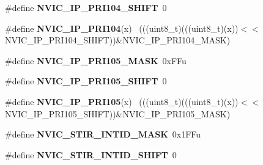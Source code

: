 \begin{DoxyCompactItemize}
\item 
\hypertarget{group___n_v_i_c___register___masks_ga5124fd80e722da1ac6aa1f2109ce0132}{}\#define {\bfseries N\+V\+I\+C\+\_\+\+I\+P\+\_\+\+P\+R\+I104\+\_\+\+S\+H\+I\+F\+T}~0\label{group___n_v_i_c___register___masks_ga5124fd80e722da1ac6aa1f2109ce0132}

\item 
\hypertarget{group___n_v_i_c___register___masks_gaeb4cff0ccb42c6ee2872c860039c05dd}{}\#define {\bfseries N\+V\+I\+C\+\_\+\+I\+P\+\_\+\+P\+R\+I104}(x)                                            ~(((uint8\+\_\+t)(((uint8\+\_\+t)(x))$<$$<$N\+V\+I\+C\+\_\+\+I\+P\+\_\+\+P\+R\+I104\+\_\+\+S\+H\+I\+F\+T))\&N\+V\+I\+C\+\_\+\+I\+P\+\_\+\+P\+R\+I104\+\_\+\+M\+A\+S\+K)\label{group___n_v_i_c___register___masks_gaeb4cff0ccb42c6ee2872c860039c05dd}

\item 
\hypertarget{group___n_v_i_c___register___masks_gae42f2672541d808a9a15fa95a7331aed}{}\#define {\bfseries N\+V\+I\+C\+\_\+\+I\+P\+\_\+\+P\+R\+I105\+\_\+\+M\+A\+S\+K}~0x\+F\+Fu\label{group___n_v_i_c___register___masks_gae42f2672541d808a9a15fa95a7331aed}

\item 
\hypertarget{group___n_v_i_c___register___masks_ga07317c8ff3f511dddf014970a1abb661}{}\#define {\bfseries N\+V\+I\+C\+\_\+\+I\+P\+\_\+\+P\+R\+I105\+\_\+\+S\+H\+I\+F\+T}~0\label{group___n_v_i_c___register___masks_ga07317c8ff3f511dddf014970a1abb661}

\item 
\hypertarget{group___n_v_i_c___register___masks_gae83d8a206aaa8cb026a0945a7008444b}{}\#define {\bfseries N\+V\+I\+C\+\_\+\+I\+P\+\_\+\+P\+R\+I105}(x)                                            ~(((uint8\+\_\+t)(((uint8\+\_\+t)(x))$<$$<$N\+V\+I\+C\+\_\+\+I\+P\+\_\+\+P\+R\+I105\+\_\+\+S\+H\+I\+F\+T))\&N\+V\+I\+C\+\_\+\+I\+P\+\_\+\+P\+R\+I105\+\_\+\+M\+A\+S\+K)\label{group___n_v_i_c___register___masks_gae83d8a206aaa8cb026a0945a7008444b}

\item 
\hypertarget{group___n_v_i_c___register___masks_gae952664a9f674335808d7228cbd5d01a}{}\#define {\bfseries N\+V\+I\+C\+\_\+\+S\+T\+I\+R\+\_\+\+I\+N\+T\+I\+D\+\_\+\+M\+A\+S\+K}~0x1\+F\+Fu\label{group___n_v_i_c___register___masks_gae952664a9f674335808d7228cbd5d01a}

\item 
\hypertarget{group___n_v_i_c___register___masks_ga5302b21fab0b5ad5f51935600b54f9cc}{}\#define {\bfseries N\+V\+I\+C\+\_\+\+S\+T\+I\+R\+\_\+\+I\+N\+T\+I\+D\+\_\+\+S\+H\+I\+F\+T}~0\label{group___n_v_i_c___register___masks_ga5302b21fab0b5ad5f51935600b54f9cc}


\end{DoxyCompactItemize}
